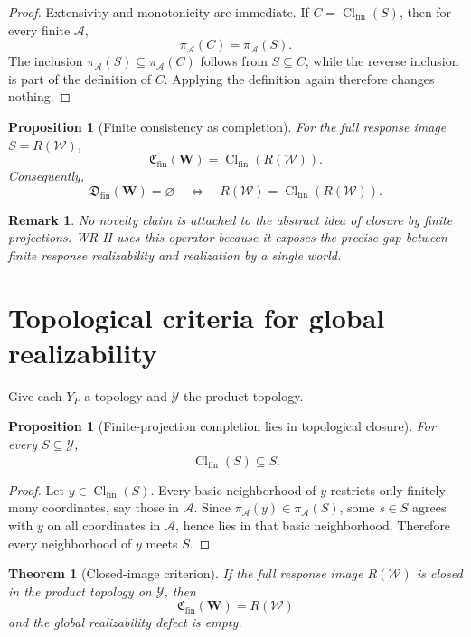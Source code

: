 \documentclass[11pt]{article}
\newtheorem{proposition}[definition]{Proposition}
\newtheorem{theorem}[definition]{Theorem}
\newtheorem{remark}[definition]{Remark}
\newcommand{\W}{\mathcal W}
\newcommand{\Acal}{\mathcal A}
\newcommand{\Y}{\mathcal Y}
\newcommand{\Cfin}{\mathfrak C_{\mathrm{fin}}}
\newcommand{\Dfin}{\mathfrak D_{\mathrm{fin}}}
\begin{document}
\begin{proof}
Extensivity and monotonicity are immediate. If
$C=\operatorname{Cl}_{\mathrm{fin}}(S)$, then for every finite $\Acal$,
\[
\pi_{\Acal}(C)=\pi_{\Acal}(S).
\]
The inclusion $\pi_{\Acal}(S)\subseteq\pi_{\Acal}(C)$ follows from
$S\subseteq C$, while the reverse inclusion is part of the definition of $C$.
Applying the definition again therefore changes nothing.
\end{proof}

\begin{proposition}[Finite consistency as completion]\label{prop:completion}
For the full response image $S=R(\W)$,
\[
\Cfin(\mathbf W)
=
\operatorname{Cl}_{\mathrm{fin}}(R(\W)).
\]
Consequently,
\[
\Dfin(\mathbf W)=\varnothing
\quad\Longleftrightarrow\quad
R(\W)
=
\operatorname{Cl}_{\mathrm{fin}}(R(\W)).
\]
\end{proposition}

\begin{remark}
No novelty claim is attached to the abstract idea of closure by finite
projections. WR-II uses this operator because it exposes the precise gap
between finite response realizability and realization by a single world.
\end{remark}

\section{Topological criteria for global realizability}

Give each $Y_P$ a topology and $\Y$ the product topology.

\begin{proposition}[Finite-projection completion lies in topological closure]
For every $S\subseteq\Y$,
\[
\operatorname{Cl}_{\mathrm{fin}}(S)
\subseteq
\overline S.
\]
\end{proposition}

\begin{proof}
Let $y\in\operatorname{Cl}_{\mathrm{fin}}(S)$. Every basic neighborhood of
$y$ restricts only finitely many coordinates, say those in $\Acal$. Since
$\pi_{\Acal}(y)\in\pi_{\Acal}(S)$, some $s\in S$ agrees with $y$ on all
coordinates in $\Acal$, hence lies in that basic neighborhood. Therefore every
neighborhood of $y$ meets $S$.
\end{proof}

\begin{theorem}[Closed-image criterion]\label{thm:closed-image}
If the full response image $R(\W)$ is closed in the product topology on $\Y$,
then
\[
\Cfin(\mathbf W)=R(\W)
\]
and the global realizability defect is empty.
\end{theorem}
\end{document}
